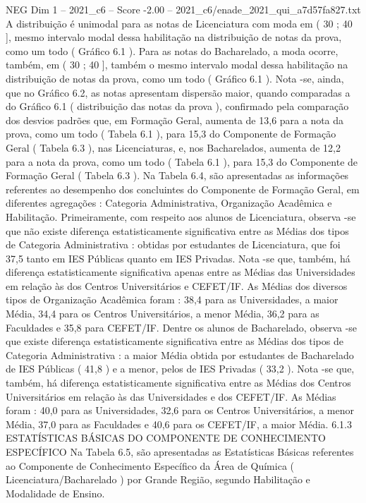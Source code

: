\begin{textsample}{NEG Dim 1 – 2021\_c6 – Score -2.00 – 2021\_c6/enade\_2021\_qui\_a7d57fa827.txt}
A distribuição é unimodal para as notas de Licenciatura com moda em ( 30 ; 40 ], mesmo intervalo modal dessa habilitação na distribuição de notas da prova, como um todo ( Gráfico 6.1 ).
Para as notas do Bacharelado, a moda ocorre, também, em ( 30 ; 40 ], também o mesmo intervalo modal dessa habilitação na distribuição de notas da prova, como um todo ( Gráfico 6.1 ).
Nota -se, ainda, que no Gráfico 6.2, as notas apresentam dispersão maior, quando comparadas a do Gráfico 6.1 ( distribuição das notas da prova ), confirmado pela comparação dos desvios padrões que, em Formação Geral, aumenta de 13,6 para a nota da prova, como um todo ( Tabela 6.1 ), para 15,3 do Componente de Formação Geral ( Tabela 6.3 ), nas Licenciaturas, e, nos Bacharelados, aumenta de 12,2 para a nota da prova, como um todo ( Tabela 6.1 ), para 15,3 do Componente de Formação Geral ( Tabela 6.3 ).
Na Tabela 6.4, são apresentadas as informações referentes ao desempenho dos concluintes do Componente de Formação Geral, em diferentes agregações : Categoria Administrativa, Organização Acadêmica e Habilitação.
Primeiramente, com respeito aos alunos de Licenciatura, observa -se que não existe diferença estatisticamente significativa entre as Médias dos tipos de Categoria Administrativa : obtidas por estudantes de Licenciatura, que foi 37,5 tanto em IES Públicas quanto em IES Privadas.
Nota -se que, também, há diferença estatisticamente significativa apenas entre as Médias das Universidades em relação às dos Centros Universitários e CEFET/IF.
As Médias dos diversos tipos de Organização Acadêmica foram : 38,4 para as Universidades, a maior Média, 34,4 para os Centros Universitários, a menor Média, 36,2 para as Faculdades e 35,8 para CEFET/IF.
Dentre os alunos de Bacharelado, observa -se que existe diferença estatisticamente significativa entre as Médias dos tipos de Categoria Administrativa : a maior Média obtida por estudantes de Bacharelado de IES Públicas ( 41,8 ) e a menor, pelos de IES Privadas ( 33,2 ).
Nota -se que, também, há diferença estatisticamente significativa entre as Médias dos Centros Universitários em relação às das Universidades e dos CEFET/IF.
As Médias foram : 40,0 para as Universidades, 32,6 para os Centros Universitários, a menor Média, 37,0 para as Faculdades e 40,6 para os CEFET/IF, a maior Média. 6.1.3 ESTATÍSTICAS BÁSICAS DO COMPONENTE DE CONHECIMENTO ESPECÍFICO Na Tabela 6.5, são apresentadas as Estatísticas Básicas referentes ao Componente de Conhecimento Específico da Área de Química ( Licenciatura/Bacharelado ) por Grande Região, segundo Habilitação e Modalidade de Ensino.

\end{textsample}
